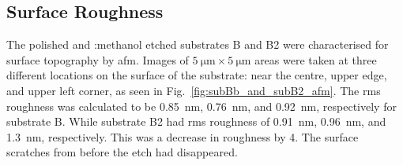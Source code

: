\subsection{Surface Roughness}

The polished and :methanol etched substrates B and B2 were characterised for surface topography by \ac{afm}. Images of $\SI{5}{\micro\metre}\times\SI{5}{\micro\metre}$ areas were taken at three different locations on the surface of the substrate: near the centre, upper edge, and upper left corner, as seen in Fig.~\ref{fig:subBb_and_subB2_afm}. The \ac{rms} roughness was calculated to be \SI{0.85}{\nano\metre}, \SI{0.76}{\nano\metre}, and \SI{0.92}{\nano\metre}, respectively for substrate B. While substrate B2 had \ac{rms} roughness of \SI{0.91}{\nano\metre}, \SI{0.96}{\nano\metre}, and \SI{1.3}{\nano\metre}, respectively. This was a decrease in roughness by 4. The surface scratches from before the etch had disappeared.

